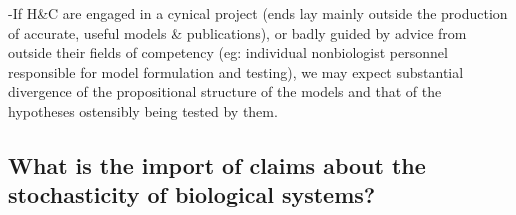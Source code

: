 -If H\&C are engaged in a cynical project (ends lay mainly outside the production of accurate, useful models \& publications), or badly guided by advice from outside their fields of competency (eg: individual nonbiologist personnel responsible for model formulation and testing), we may expect substantial divergence of the propositional structure of the models and that of the hypotheses ostensibly being tested by them.



\subsection{What is the import of claims about the stochasticity of biological systems?}

